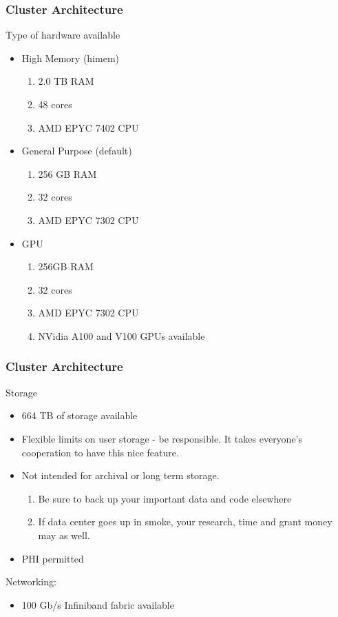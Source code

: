 \documentclass{beamer}
\begin{document}
\begin{frame}
\frametitle{Cluster Architecture}
Type of hardware available
\begin{itemize}
    \item High Memory (himem)
    \begin{enumerate}
        \item 2.0 TB RAM
        \item 48 cores 
        \item AMD EPYC 7402 CPU
    \end{enumerate}
    \bigskip
    \pause
    \item General Purpose (default)
    \begin{enumerate}
        \item 256 GB RAM
        \item 32 cores 
        \item AMD EPYC 7302 CPU
    \end{enumerate}
    \bigskip
    \pause
    \item GPU 
    \begin{enumerate}
        \item 256GB RAM 
        \item 32 cores 
        \item AMD EPYC 7302 CPU
        \item NVidia A100 and V100 GPUs available
    \end{enumerate}
\end{itemize}
\end{frame}


\begin{frame}
\frametitle{Cluster Architecture}
Storage 
\begin{itemize}
    \item 664 TB of storage available
    \pause
    \item Flexible limits on user storage - be responsible.
          It takes everyone's cooperation to have this nice feature.
    \pause
    \item Not intended for archival or long term storage.
        \begin{enumerate}
              \item Be sure to back up your important data and code elsewhere
              \pause
              \item If data center goes up in smoke, your research, time and grant money may as well.
        \end{enumerate}
    \pause
    \item PHI permitted
\end{itemize}
\pause
Networking:
\begin{itemize}
    \item 100 Gb/s Infiniband fabric available
\end{itemize}
\end{frame}
\end{document}

